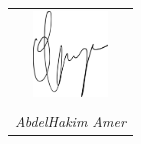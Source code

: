 \begin{table}[b]
	\centering
		\begin{tabular}{c}
            \vspace{-1.1cm}
            \hspace{0.6cm}
			\includegraphics[width = 2cm]{figs/formal/signature_new.pdf}\\  %
            \underline{\phantom{mmmmmmmmmmmmmmmmmmm}} \\
			\textit{AbdelHakim Amer} %
		\end{tabular}
\end{table}




\vfill